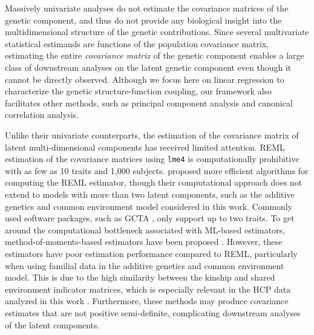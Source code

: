\documentclass[12pt]{article}
\begin{document}
Massively univariate analyses do not estimate the covariance matrices of the genetic component, and thus do not provide any biological insight into the multidimensional structure of the genetic contributions. Since several multivariate statistical estimands are functions of the population covariance matrix,  estimating the entire \textit{covariance matrix} of the genetic component enables a large class of downstream analyses on the latent genetic component even though it cannot be directly observed. Although we focus here on linear regression to characterize the genetic structure-function coupling, our framework also facilitates other methods, such as principal component analysis and canonical correlation analysis.


Unlike their univariate counterparts, the estimation of the covariance matrix of latent multi-dimensional components has received limited attention. REML estimation of the covariance matrices using \texttt{lme4} \parencite{bates2013fast} is computationally prohibitive with as few as 10 traits and 1,000 subjects. \textcite{zhou2014efficient} proposed more efficient algorithms for computing the REML estimator, though their computational approach does not extend to models with more than two latent components, such as the additive genetics and common environment model considered in this work. Commonly used software packages, such as GCTA \parencite{yang2011gcta}, only support up to two traits. To get around the computational bottleneck associated with ML-based estimators, method-of-moments-based estimators have been proposed \parencite{ge2016multidimensional, liegeois2019resting, anderson2021heritability}. However, these estimators have poor estimation performance compared to REML, particularly when using familial data in the additive genetics and common environment model. This is due to the high similarity between the kinship and shared environment indicator matrices, which is especially relevant in the HCP data analyzed in this work \parencite{ge2016multidimensional}. Furthermore, these methods may produce covariance estimates that are not positive semi-definite, complicating downstream analyses of the latent components. 
\end{document}
